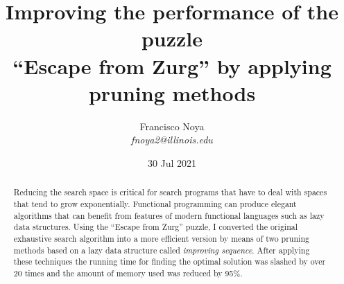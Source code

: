 \documentclass[journal,onecolumn]{IEEEtran}
\begin{document}

\title{Improving the performance of the puzzle \\``Escape from Zurg'' by applying \\pruning methods}
%

%


\author{
%
 Francisco Noya

 \textit{fnoya2@illinois.edu}
}
\date{30 Jul 2021}
\maketitle
\begin{abstract}\normalsize
 Reducing the search space is critical for search programs that have to deal with
 spaces that tend to grow exponentially. Functional programming can produce elegant
 algorithms that can benefit from features of modern functional languages such as
 lazy data structures. Using the ``Escape from Zurg'' puzzle, I converted the original exhaustive
 search algorithm into a more efficient version by means of two pruning methods based on
 a lazy data structure called \textit{improving sequence}. After applying these techniques the running time for finding the optimal
 solution was slashed by over 20 times and the amount of memory used was
 reduced by 95\%.
\end{abstract}
\end{document}
